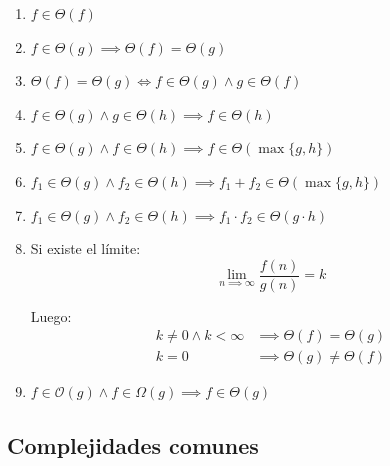 \documentclass{article}
\newcommand{\BigO}[1]{{\mathcal{O}(#1)}}
\newcommand{\BigOmega}[1]{{\Omega(#1)}}
\newcommand{\BigTheta}[1]{{\Theta(#1)}}
\begin{document}
\begin{enumerate}
    \item $f \in \BigTheta{f}$
    \item $f \in \BigTheta{g} \implies \BigTheta{f} = \BigTheta{g}$
    \item $\BigTheta{f} = \BigTheta{g} \iff f \in \BigTheta{g} \land g \in \BigTheta{f}$
    \item $f \in \BigTheta{g} \land g \in \BigTheta{h} \implies f \in \BigTheta{h}$
    \item $f \in \BigTheta{g} \land f \in \BigTheta{h} \implies f \in \BigTheta{\max{\{g, h\}}}$
    \item $f_1 \in \BigTheta{g} \land f_2 \in \BigTheta{h} \implies f_1 + f_2 \in \BigTheta{\max{\{g, h\}}}$
    \item $f_1 \in \BigTheta{g} \land f_2 \in \BigTheta{h} \implies f_1 \cdot f_2 \in \BigTheta{g \cdot h}$
    \item Si existe el límite:
          $$\lim_{n \implies \infty} \frac{f(n)}{g(n)} = k$$

          Luego:
          \begin{align*}
              k \neq 0 \land k < \infty & \implies \BigTheta{f} = \BigTheta{g}    \\
              k = 0                     & \implies \BigTheta{g} \neq \BigTheta{f}
          \end{align*}
    \item $f \in \BigO{g} \land f \in \BigOmega{g} \implies f \in \BigTheta{g}$
\end{enumerate}

\subsection{Complejidades comunes}
\end{document}
